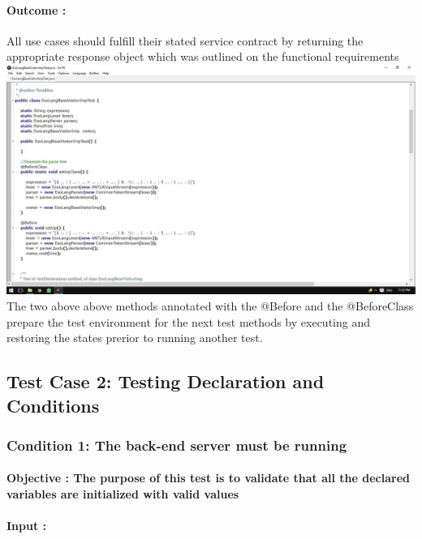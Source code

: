 \documentclass[english]{article}
\begin{document}
			\paragraph{Outcome :}All use cases should fulfill their stated service contract by returning the appropriate response object  which was outlined on the functional requirements\\
		
			\includegraphics[width=\linewidth]{test1.jpg}
			\\[12pt]
			The two above above methods annotated with the @Before and the @BeforeClass prepare the test environment for the next test methods by executing and restoring the states prerior to running another test. 
			
			\subsection{Test Case 2: Testing Declaration and Conditions}
			\subsubsection{Condition 1: The back-end server must be running }
			\paragraph{Objective : The purpose of this test is to validate that all the declared variables are initialized with valid values}
			\paragraph{Input :}
\end{document}

